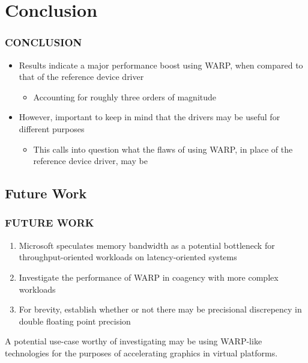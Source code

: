 
\section{Conclusion}
\begin{frame}
\frametitle{CONCLUSION}

\begin{itemize}
\item Results indicate a major performance boost using WARP, when compared to that of the reference device driver
  \begin{itemize}
  \item Accounting for roughly three orders of magnitude
  \end{itemize}
\item However, important to keep in mind that the drivers may be useful for different purposes
  \begin{itemize}
  \item This calls into question what the flaws of using WARP, in place of the reference device driver, may be
  \end{itemize}
\end{itemize}

\end{frame}

\subsection{Future Work}
\begin{frame}
\frametitle{FUTURE WORK}

\begin{enumerate}
\item Microsoft speculates memory bandwidth as a potential bottleneck for throughput-oriented workloads on latency-oriented systems
\item Investigate the performance of WARP in coagency with more complex workloads
\item For brevity, establish whether or not there may be precisional discrepency in double floating point precision
\end{enumerate}

A potential use-case worthy of investigating may be using WARP-like technologies for the purposes of accelerating graphics in virtual platforms.

\end{frame}
